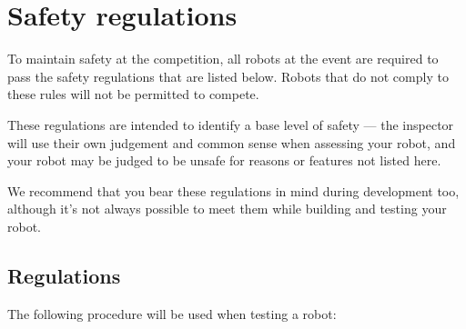 \section {Safety regulations}
\label{sec:safety-regs}

To maintain safety at the competition, all robots at the event are required to
pass the safety regulations that are listed below. Robots that do not comply
to these rules will not be permitted to compete.

These regulations are intended to identify a base level of safety --- the
inspector will use their own judgement and common sense when assessing
your robot, and your robot may be judged to be unsafe for reasons or features
not listed here.

We recommend that you bear these regulations in mind during development too,
although it's not always possible to meet them while building and testing
your robot.

\subsection{Regulations}

The following procedure will be used when testing a robot:

